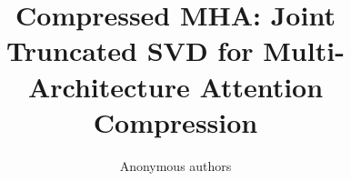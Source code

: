 \title{\textbf{Compressed MHA: Joint Truncated SVD for Multi-Architecture Attention Compression}}

\author{Anonymous authors}
